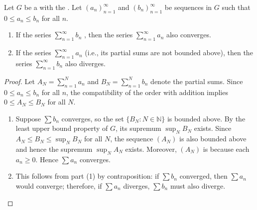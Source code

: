 \begin{theorem} \label{theorem:comparison_test_for_series_of_nonnegative_real_numbers}
    Let $G$ be a  with the . Let $(a_n)_{n=1}^\infty$ and $(b_n)_{n=1}^\infty$ be sequences in $G$ such that $0 \leq a_n \leq b_n$ for all $n$.

    \begin{enumerate}
        \item If the series $\sum_{n=1}^\infty b_n$ , then the series $\sum_{n=1}^\infty a_n$ also converges.
        \item If the series $\sum_{n=1}^\infty a_n$  (i.e., its partial sums are not bounded above), then the series $\sum_{n=1}^\infty b_n$ also diverges.
    \end{enumerate}
\end{theorem}
\begin{proof}
    Let $A_N = \sum_{n=1}^N a_n$ and $B_N = \sum_{n=1}^N b_n$ denote the partial sums. Since $0 \leq a_n \leq b_n$ for all $n$, the compatibility of the order with addition implies $0 \leq A_N \leq B_N$ for all $N$.

    \begin{enumerate}
        \item Suppose $\sum b_n$ converges, so the set $\{B_N : N \in \mathbb{N}\}$ is bounded above. By the least upper bound property of $G$, its supremum $\sup_N B_N$ exists. Since $A_N \leq B_N \leq \sup_N B_N$ for all $N$, the sequence $(A_N)$ is also bounded above and hence the supremum $\sup_N A_N$ exists. Moreover, $(A_N)$ is  because each $a_n \geq 0$. Hence $\sum a_n$ converges.

        \item This follows from part (1) by contraposition: if $\sum b_n$ converged, then $\sum a_n$ would converge; therefore, if $\sum a_n$ diverges, $\sum b_n$ must also diverge.
    \end{enumerate}
\end{proof}
